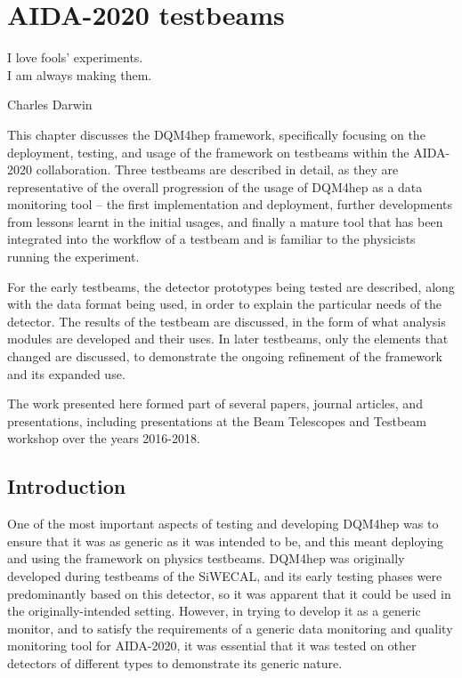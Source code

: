 \chapter{\acrshort{AIDA}-2020 testbeams}
\label{chapter:aidatestbeams}

\epigraph{I love fools' experiments. \\I am always making them.}{Charles Darwin}

This chapter discusses the \acrshort{DQM4hep} framework, specifically focusing on the deployment, testing, and usage of the framework on testbeams within the \acrshort{AIDA}-2020 collaboration. Three testbeams are described in detail, as they are representative of the overall progression of the usage of \acrshort{DQM4hep} as a data monitoring tool -- the first implementation and deployment, further developments from lessons learnt in the initial usages, and finally a mature tool that has been integrated into the workflow of a testbeam and is familiar to the physicists running the experiment.

For the early testbeams, the detector prototypes being tested are described, along with the data format being used, in order to explain the particular needs of the detector. The results of the testbeam are discussed, in the form of what analysis modules are developed and their uses. In later testbeams, only the elements that changed are discussed, to demonstrate the ongoing refinement of the framework and its expanded use.

The work presented here formed part of several papers, journal articles, and presentations, including presentations at the Beam Telescopes and Testbeam workshop over the years 2016-2018.

\section{Introduction}
One of the most important aspects of testing and developing \acrshort{DQM4hep} was to ensure that it was as generic as it was intended to be, and this meant deploying and using the framework on physics testbeams. \acrshort{DQM4hep} was originally developed during testbeams of the \acrfull{SiWECAL}, and its early testing phases were predominantly based on this detector, so it was apparent that it could be used in the originally-intended setting. However, in trying to develop it as a generic monitor, and to satisfy the requirements of a generic data monitoring and quality monitoring tool for \acrshort{AIDA}-2020, it was essential that it was tested on other detectors of different types to demonstrate its generic nature. 

